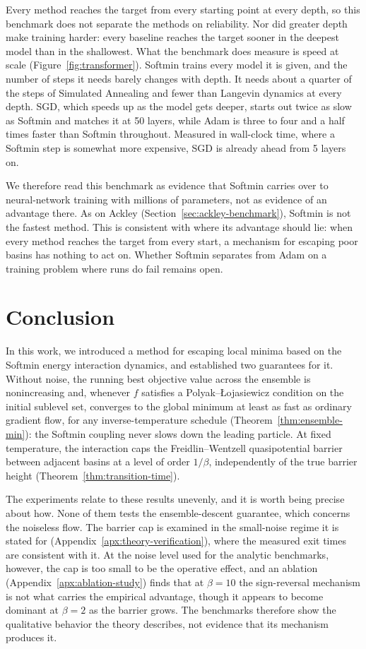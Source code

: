 \documentclass{article}
\theoremstyle{plain}
\theoremstyle{definition}
\theoremstyle{remark}
\begin{document}
Every method reaches the target from every starting point at every depth, so this benchmark does not separate the methods on
reliability. Nor did greater depth make training harder: every baseline reaches the target sooner
in the deepest model than in the shallowest. What the benchmark does measure is speed at scale
(Figure~\ref{fig:transformer}). Softmin trains every model it is given, and the number of
steps it needs barely changes with depth. It needs about a quarter of the steps of Simulated
Annealing and fewer than Langevin dynamics at every depth. SGD, which speeds up as the model gets
deeper, starts out twice as slow as Softmin and matches it at 50 layers, while Adam is three to
four and a half times faster than Softmin throughout. Measured in wall-clock time, where a Softmin
step is somewhat more expensive, SGD is already ahead from 5 layers on.

We therefore read this benchmark as evidence that Softmin carries over to neural-network training
with millions of parameters, not as evidence of an advantage there. As on Ackley
(Section~\ref{sec:ackley-benchmark}), Softmin is not the fastest method. This is consistent with
where its advantage should lie: when every method reaches the target from every start, a mechanism
for escaping poor basins has nothing to act on. Whether Softmin separates from Adam on a training
problem where runs do fail remains open.

\section{Conclusion}

In this work, we introduced a method for escaping local minima based on the Softmin energy interaction dynamics, and established two guarantees for it. Without noise, the running best objective value across the ensemble is nonincreasing and, whenever $f$ satisfies a Polyak--\L{}ojasiewicz condition on the initial sublevel set, converges to the global minimum at least as fast as ordinary gradient flow, for any inverse-temperature schedule (Theorem~\ref{thm:ensemble-min}): the Softmin coupling never slows down the leading particle. At fixed temperature, the interaction caps the Freidlin--Wentzell quasipotential barrier between adjacent basins at a level of order $1/\beta$, independently of the true barrier height (Theorem~\ref{thm:transition-time}).

The experiments relate to these results unevenly, and it is worth being precise about how. None of them tests the ensemble-descent guarantee, which concerns the noiseless flow. The barrier cap is examined in the small-noise regime it is stated for (Appendix~\ref{apx:theory-verification}), where the measured exit times are consistent with it. At the noise level used for the analytic benchmarks, however, the cap is too small to be the operative effect, and an ablation (Appendix~\ref{apx:ablation-study}) finds that at $\beta=10$ the sign-reversal mechanism is not what carries the empirical advantage, though it appears to become dominant at $\beta=2$ as the barrier grows. The benchmarks therefore show the qualitative behavior the theory describes, not evidence that its mechanism produces it.
\end{document}
